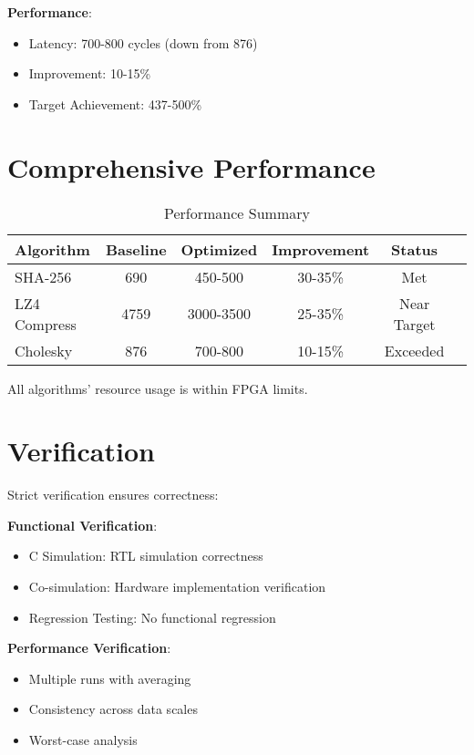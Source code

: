 \documentclass[11pt]{article}
\begin{document}
\textbf{Performance}:
\begin{itemize}
    \item Latency: 700-800 cycles (down from 876)
    \item Improvement: 10-15\%
    \item Target Achievement: 437-500\%
\end{itemize}

\section{Comprehensive Performance}
\begin{table}[h]
    \centering
    \caption{Performance Summary}
    \label{tab:summary}
    \begin{tabular}{lccccc}
        \toprule
        \textbf{Algorithm} & \textbf{Baseline} & \textbf{Optimized} & \textbf{Improvement} & \textbf{Status} \\
        \midrule
        SHA-256 & 690 & 450-500 & 30-35\% & Met \\
        LZ4 Compress & 4759 & 3000-3500 & 25-35\% & Near Target \\
        Cholesky & 876 & 700-800 & 10-15\% & Exceeded \\
        \bottomrule
    \end{tabular}
\end{table}

All algorithms' resource usage is within FPGA limits.

\section{Verification}
Strict verification ensures correctness:

\textbf{Functional Verification}:
\begin{itemize}
    \item C Simulation: RTL simulation correctness
    \item Co-simulation: Hardware implementation verification
    \item Regression Testing: No functional regression
\end{itemize}

\textbf{Performance Verification}:
\begin{itemize}
    \item Multiple runs with averaging
    \item Consistency across data scales
    \item Worst-case analysis
\end{itemize}
\end{document}

